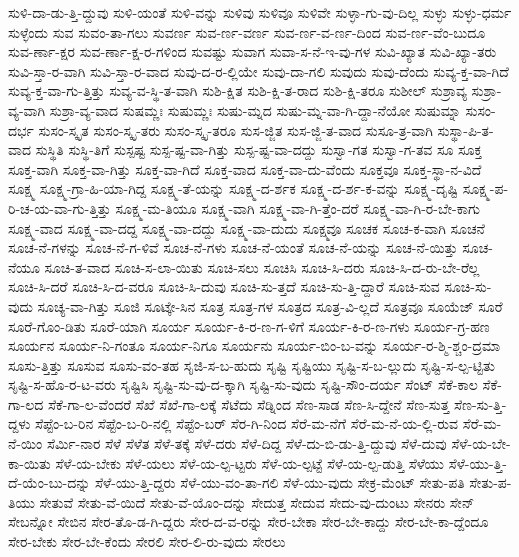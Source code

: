 {ಸುಳಿ-ದಾ-ಡು-ತ್ತಿ-ದ್ದುವು
ಸುಳಿ-ಯಂತೆ
ಸುಳಿ-ವನ್ನು
ಸುಳಿವು
ಸುಳಿವೂ
ಸುಳಿವೇ
ಸುಳ್ಳಾ-ಗು-ವು-ದಿಲ್ಲ
ಸುಳ್ಳು
ಸುಳ್ಳು-ಧರ್ಮ
ಸುಳ್ಳೆಂದು
ಸುವ
ಸುವಂ-ತಾ-ಗಲು
ಸುವರ್ಣ
ಸುವ-ರ್ಣ-ವರ್ಣ
ಸುವ-ರ್ಣ-ವ-ರ್ಣ-ದಿಂದ
ಸುವ-ರ್ಣ-ವೆಂ-ಬುದೂ
ಸುವ-ರ್ಣಾ-ಕ್ಷರ
ಸುವ-ರ್ಣಾ-ಕ್ಷ-ರ-ಗಳಿಂದ
ಸುವಷ್ಟು
ಸುವಾಗ
ಸುವಾ-ಸ-ನೆ-ಇ-ವು-ಗಳ
ಸುವಿ-ಖ್ಯಾತ
ಸುವಿ-ಖ್ಯಾ-ತರು
ಸುವಿ-ಸ್ತಾ-ರ-ವಾಗಿ
ಸುವಿ-ಸ್ತಾ-ರ-ವಾದ
ಸುವು-ದ-ರ-ಲ್ಲಿಯೇ
ಸುವು-ದಾ-ಗಲಿ
ಸುವುದು
ಸುವು-ದೆಂದು
ಸುವ್ಯ-ಕ್ತ-ವಾ-ಗಿದೆ
ಸುವ್ಯ-ಕ್ತ-ವಾ-ಗು-ತ್ತಿತ್ತು
ಸುವ್ಯ-ವ-ಸ್ಥಿ-ತ-ವಾಗಿ
ಸುಶಿ-ಕ್ಷಿತ
ಸುಶಿ-ಕ್ಷಿ-ತ-ರಾದ
ಸುಶಿ-ಕ್ಷಿ-ತರೂ
ಸುಶೀಲ್
ಸುಶ್ರಾವ್ಯ
ಸುಶ್ರಾ-ವ್ಯ-ವಾಗಿ
ಸುಶ್ರಾ-ವ್ಯ-ವಾದ
ಸುಷಮ್ಣಃ
ಸುಷುಮ್ಣಃ
ಸುಷು-ಮ್ನದ
ಸುಷು-ಮ್ನ-ವಾ-ಗಿ-ದ್ದಾ-ನೆಯೋ
ಸುಷುಮ್ನಾ
ಸುಸಂ-ದರ್ಭ
ಸುಸಂ-ಸ್ಕೃತ
ಸುಸಂ-ಸ್ಕೃ-ತರು
ಸುಸಂ-ಸ್ಕೃ-ತರೂ
ಸುಸ-ಜ್ಜಿತ
ಸುಸ-ಜ್ಜಿ-ತ-ವಾದ
ಸುಸೂ-ತ್ರ-ವಾಗಿ
ಸುಸ್ಥಾ-ಪಿ-ತ-ವಾದ
ಸುಸ್ಥಿತಿ
ಸುಸ್ಥಿ-ತಿಗೆ
ಸುಸ್ಪಷ್ಟ
ಸುಸ್ಪ-ಷ್ಟ-ವಾ-ಗಿತ್ತು
ಸುಸ್ಪ-ಷ್ಟ-ವಾ-ದದ್ದು
ಸುಸ್ವಾ-ಗತ
ಸುಸ್ವಾ-ಗ-ತವ
ಸೂ
ಸೂಕ್ತ
ಸೂಕ್ತ-ವಾಗಿ
ಸೂಕ್ತ-ವಾ-ಗಿತ್ತು
ಸೂಕ್ತ-ವಾ-ಗಿದೆ
ಸೂಕ್ತ-ವಾದ
ಸೂಕ್ತ-ವಾ-ದು-ವೆಂದು
ಸೂಕ್ತವೂ
ಸೂಕ್ತ-ಸ್ಥಾ-ನ-ವಿದೆ
ಸೂಕ್ಷ್ಮ
ಸೂಕ್ಷ್ಮ-ಗ್ರಾ-ಹಿ-ಯಾ-ಗಿದ್ದ
ಸೂಕ್ಷ್ಮ-ತೆ-ಯನ್ನು
ಸೂಕ್ಷ್ಮ-ದ-ರ್ಶಕ
ಸೂಕ್ಷ್ಮ-ದ-ರ್ಶ-ಕ-ವನ್ನು
ಸೂಕ್ಷ್ಮ-ದೃಷ್ಟಿ
ಸೂಕ್ಷ್ಮ-ಪ-ರಿ-ಚ-ಯ-ವಾ-ಗು-ತ್ತಿತ್ತು
ಸೂಕ್ಷ್ಮ-ಮ-ತಿಯೂ
ಸೂಕ್ಷ್ಮ-ವಾಗಿ
ಸೂಕ್ಷ್ಮ-ವಾ-ಗಿ-ತ್ತೆಂ-ದರೆ
ಸೂಕ್ಷ್ಮ-ವಾ-ಗಿ-ರ-ಬೇ-ಕಾಗು
ಸೂಕ್ಷ್ಮ-ವಾದ
ಸೂಕ್ಷ್ಮ-ವಾ-ದದ್ದ
ಸೂಕ್ಷ್ಮ-ವಾ-ದದ್ದು
ಸೂಕ್ಷ್ಮ-ವಾ-ದುದು
ಸೂಕ್ಷ್ಮವೂ
ಸೂಚಕ
ಸೂಚ-ಕ-ವಾಗಿ
ಸೂಚನೆ
ಸೂಚ-ನೆ-ಗಳನ್ನು
ಸೂಚ-ನೆ-ಗ-ಳಿವೆ
ಸೂಚ-ನೆ-ಗಳು
ಸೂಚ-ನೆ-ಯಂತೆ
ಸೂಚ-ನೆ-ಯನ್ನು
ಸೂಚ-ನೆ-ಯಿತ್ತು
ಸೂಚ-ನೆಯೂ
ಸೂಚಿ-ತ-ವಾದ
ಸೂಚಿ-ಸ-ಲಾ-ಯಿತು
ಸೂಚಿ-ಸಲು
ಸೂಚಿಸಿ
ಸೂಚಿ-ಸಿ-ದರು
ಸೂಚಿ-ಸಿ-ದ-ರು-ಬೇ-ರೆಲ್ಲ
ಸೂಚಿ-ಸಿ-ದರೆ
ಸೂಚಿ-ಸಿ-ದ-ವರೂ
ಸೂಚಿ-ಸಿ-ದುವು
ಸೂಚಿ-ಸು-ತ್ತದೆ
ಸೂಚಿ-ಸು-ತ್ತಿ-ದ್ದಾರೆ
ಸೂಚಿ-ಸುವ
ಸೂಚಿ-ಸು-ವುದು
ಸೂಚ್ಯ-ವಾ-ಗಿತ್ತು
ಸೂಜಿ
ಸೂಟ್ಕೇ-ಸಿನ
ಸೂತ್ರ
ಸೂತ್ರ-ಗಳ
ಸೂತ್ರದ
ಸೂತ್ರ-ವಿ-ಲ್ಲದೆ
ಸೂತ್ರವೂ
ಸೂಯೆಜ್
ಸೂರೆ
ಸೂರೆ-ಗೊಂ-ಡಿತು
ಸೂರೆ-ಯಾಗಿ
ಸೂರ್ಯ
ಸೂರ್ಯ-ಕಿ-ರ-ಣ-ಗ-ಳಿಗೆ
ಸೂರ್ಯ-ಕಿ-ರ-ಣ-ಗಳು
ಸೂರ್ಯ-ಗ್ರ-ಹಣ
ಸೂರ್ಯನ
ಸೂರ್ಯ-ನಿ-ಗಂತೂ
ಸೂರ್ಯ-ನಿಗೂ
ಸೂರ್ಯನು
ಸೂರ್ಯ-ಬಿಂ-ಬ-ವನ್ನು
ಸೂರ್ಯ-ರ-ಶ್ಮಿ-ಶ್ಚಂ-ದ್ರಮಾ
ಸೂಸು-ತ್ತಿತ್ತು
ಸೂಸುವ
ಸೂಸು-ವಂ-ತಹ
ಸೃಜಿ-ಸ-ಬ-ಹುದು
ಸೃಷ್ಟಿ
ಸೃಷ್ಟಿಯು
ಸೃಷ್ಟಿ-ಸ-ಬ-ಲ್ಲುದು
ಸೃಷ್ಟಿ-ಸ-ಲ್ಪ-ಟ್ಟಿತು
ಸೃಷ್ಟಿ-ಸ-ಹೊ-ರ-ಟ-ವರು
ಸೃಷ್ಟಿಸಿ
ಸೃಷ್ಟಿ-ಸು-ವು-ದ-ಕ್ಕಾಗಿ
ಸೃಷ್ಟಿ-ಸು-ವುದು
ಸೃಷ್ಟಿ-ಸೌಂ-ದರ್ಯ
ಸೆಂಟ್
ಸೆಕೆ-ಕಾಲ
ಸೆಕೆ-ಗಾ-ಲದ
ಸೆಕೆ-ಗಾ-ಲ-ವೆಂದರೆ
ಸೆಖೆ
ಸೆಖೆ-ಗಾ-ಲಕ್ಕೆ
ಸೆಟೆದು
ಸೆಡ್ನಿಂದ
ಸೆಣ-ಸಾಡ
ಸೆಣ-ಸಿ-ದ್ದೇನೆ
ಸೆಣ-ಸುತ್ತ
ಸೆಣ-ಸು-ತ್ತಿ-ದ್ದಳು
ಸೆಪ್ಟೆಂ-ಬ-ರಿನ
ಸೆಪ್ಟೆಂ-ಬ-ರಿ-ನಲ್ಲಿ
ಸೆಪ್ಟೆಂ-ಬರ್
ಸೆರ-ಗಿ-ನಿಂದ
ಸೆರೆ-ಮ-ನೆಗೆ
ಸೆರೆ-ಮ-ನೆ-ಯ-ಲ್ಲಿ-ರುವ
ಸೆರೆ-ಮ-ನೆ-ಯಿಂ
ಸೆರ್ಮಿ-ನಾರ
ಸೆಳೆ
ಸೆಳೆತ
ಸೆಳೆ-ತಕ್ಕೆ
ಸೆಳೆ-ದರು
ಸೆಳೆ-ದಿದ್ದ
ಸೆಳೆ-ದು-ಬಿ-ಡು-ತ್ತಿ-ದ್ದುವು
ಸೆಳೆ-ದುವು
ಸೆಳೆ-ಯ-ಬೇ-ಕಾ-ಯಿತು
ಸೆಳೆ-ಯ-ಬೇಕು
ಸೆಳೆ-ಯಲು
ಸೆಳೆ-ಯ-ಲ್ಪ-ಟ್ಟರು
ಸೆಳೆ-ಯ-ಲ್ಪಟ್ಟೆ
ಸೆಳೆ-ಯ-ಲ್ಪ-ಡುತ್ತಿ
ಸೆಳೆಯು
ಸೆಳೆ-ಯು-ತ್ತಿ-ದೆ-ಯೆಂ-ಬು-ದನ್ನು
ಸೆಳೆ-ಯು-ತ್ತಿ-ದ್ದರು
ಸೆಳೆ-ಯು-ವಂ-ತಾ-ಗಲಿ
ಸೆಳೆ-ಯು-ವುದು
ಸೇಕ್ರ-ಮೆಂಟ್
ಸೇತು-ಪತಿ
ಸೇತು-ಪ-ತಿಯು
ಸೇತುವೆ
ಸೇತು-ವೆ-ಯಿದೆ
ಸೇತು-ವೆ-ಯೊಂ-ದನ್ನು
ಸೇದುತ್ತ
ಸೇದುವ
ಸೇದು-ವು-ದುಂಟು
ಸೇನರು
ಸೇನ್
ಸೇಬನ್ನೋ
ಸೇಬಿನ
ಸೇರ-ತೊ-ಡ-ಗಿ-ದ್ದರು
ಸೇರ-ದ-ವ-ರನ್ನು
ಸೇರ-ಬೇಕಾ
ಸೇರ-ಬೇ-ಕಾದ್ದು
ಸೇರ-ಬೇ-ಕಾ-ದ್ದೆಂದೂ
ಸೇರ-ಬೇಕು
ಸೇರ-ಬೇ-ಕೆಂದು
ಸೇರಲಿ
ಸೇರ-ಲಿ-ರು-ವುದು
ಸೇರಲು
}
